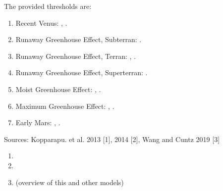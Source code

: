 \documentclass[letterpaper,10pt,english]{sphinxmanual}
\begin{document}
\sphinxAtStartPar
The provided thresholds are:
\begin{enumerate}
%
\item {} 
\sphinxAtStartPar
Recent Venus: , {\hyperref[\detokenize{quantities/insolation_models/relaxed_minimum_limit:id1}]{}}.

\item {} 
\sphinxAtStartPar
Runaway Greenhouse Effect, Subterran: .

\item {} 
\sphinxAtStartPar
Runaway Greenhouse Effect, Terran: , {\hyperref[\detokenize{quantities/insolation_models/conservative_minimum_limit:id1}]{}}.

\item {} 
\sphinxAtStartPar
Runaway Greenhouse Effect, Superterran: .

\item {} 
\sphinxAtStartPar
Moist Greenhouse Effect: , {\hyperref[\detokenize{quantities/insolation_models/earth_equivalent_limit:id1}]{}}.

\item {} 
\sphinxAtStartPar
Maximum Greenhouse Effect: , {\hyperref[\detokenize{quantities/insolation_models/conservative_maximum_limit:id1}]{}}.

\item {} 
\sphinxAtStartPar
Early Mars: , {\hyperref[\detokenize{quantities/insolation_models/relaxed_maximum_limit:id1}]{}}.

\end{enumerate}

\sphinxAtStartPar
Sources: Kopparapu. et al. 2013 {[}1{]}, 2014 {[}2{]}, Wang and Cuntz 2019 {[}3{]}
\begin{enumerate}
%
\item {} 
\sphinxAtStartPar
{}

\item {} 
\sphinxAtStartPar
{}

\item {} 
\sphinxAtStartPar
{} (overview of this and other models)

\end{enumerate}
\end{document}
